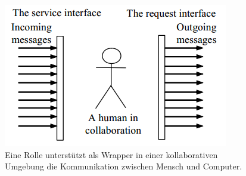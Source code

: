 \documentclass[conference]{IEEEtran}
\begin{document}
\begin{figure}
\label{fig:roleWrapper}
\includegraphics[scale = 0.8]{Images/roleWrapper.PNG}
\caption{Eine Rolle unterstützt als Wrapper in einer kollaborativen Umgebung die Kommunikation zwischen Mensch und Computer. \cite{zhu2006role}}
\end{figure}
\end{document}
